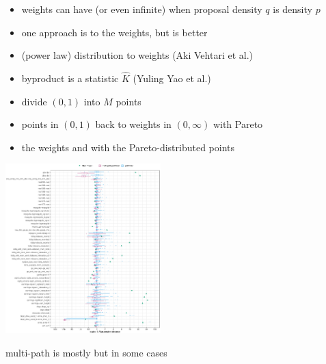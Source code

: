 \documentclass[9pt]{report}
\begin{document}
\begin{itemize}
\item weights can have  (or even infinite) when proposal density $q$ is  density $p$
\item one approach is to  the weights, but  is better
\item {} (power law) distribution to weights \hfill (Aki Vehtari et al.)
\item byproduct is a  statistic $\widehat{K}$ \hfill (Yuling Yao et al.)
\item divide $(0, 1)$ into $M$  points
\item {} points in $(0, 1)$ back to weights in $(0, \infty)$ with Pareto 
\item {} the weights and  with the Pareto-distributed points
\end{itemize}

\vspace*{-10pt}
\begin{center}
  \includegraphics[width=0.45\textwidth]{img/multi-path-Wasserstein.eps}
\end{center}
\vspace*{-6pt}
\begin{subitemize}
\item multi-path is mostly  but in some cases 
\end{subitemize}
\end{document}
